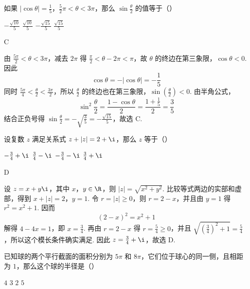 \documentclass[UTF8,a4paper,oneside,11pt]{ctexbook}
\begin{document}
\begin{problem}
如果 \(\left|\cos \theta\right| = \frac{1}{5}\)，\(\frac{5}{2}\pi < \theta < 3\pi\)，那么 \(\sin \frac{\theta}{2}\) 的值等于（\quad）

\choices
    {\(-\frac{\sqrt{10}}{5}\)}
    {\(\frac{\sqrt{10}}{5}\)}
    {\(-\frac{\sqrt{15}}{5}\)}
    {\(\frac{\sqrt{15}}{5}\)}
\end{problem}

\begin{answer}
C
\end{answer}

\begin{solution}
由 \(\frac{5\pi}{2}<\theta<3\pi\)，减去 \(2\pi\) 得 \(\frac\pi2<\theta-2\pi<\pi\)，故 \(\theta\) 的终边在第三象限，\(\cos\theta<0\). 因此
\[
\cos\theta=-|\cos\theta|=-\frac15
\]
同时 \(\frac{5\pi}{4}<\frac\theta2<\frac{3\pi}{2}\)，所以 \(\frac{\theta}{2}\) 的终边也在第三象限，\(\sin(\frac{\theta}{2})<0\). 由半角公式，
\[
\sin^2\frac{\theta}{2}=\frac{1-\cos\theta}{2}=\frac{1+\frac15}{2}=\frac35
\]
结合正负号得 \(\sin\frac{\theta}{2}=-\sqrt{\frac35}=-\frac{\sqrt{15}}5\)，故选 C.
\end{solution}

\begin{problem}
设复数 \(z\) 满足关系式 \(z + |z| = 2 + \i\)，那么 \(z\) 等于（\quad）

\choices
    {\(-\frac{3}{4} + \i\)}
    {\(\frac{3}{4} - \i\)}
    {\(-\frac{3}{4} - \i\)}
    {\(\frac{3}{4} + \i\)}
\end{problem}

\begin{answer}
D
\end{answer}

\begin{solution}
设 \(z=x+y\i\)，其中 \(x\)，\(y\in\R\)，则 \(|z|=\sqrt{x^2+y^2}\). 比较等式两边的实部和虚部，得到
\(x+|z|=2\)，\(y=1\).
令 \(r=|z|\geqslant0\)，则 \(r=2-x\)，并且由 \(y=1\) 得 \(r^2=x^2+1\). 因而
\[
(2-x)^2=x^2+1
\]
解得 \(4-4x=1\)，即 \(x=\frac34\). 再由 \(r=2-x\) 得 \(r=\frac54\geqslant0\)，并且 \(\sqrt{(\frac34)^2+1}=\frac54\)，所以这个模长条件确实满足. 因此 \(z=\frac34+\i\)，故选 D.
\end{solution}

\begin{problem}
已知球的两个平行截面的面积分别为 \(5\pi\) 和 \(8\pi\)，它们位于球心的同一侧，且相距为 \(1\)，那么这个球的半径是（\quad）

\choices
    {\(4\)}
    {\(3\)}
    {\(2\)}
    {\(5\)}
\end{problem}
\end{document}
